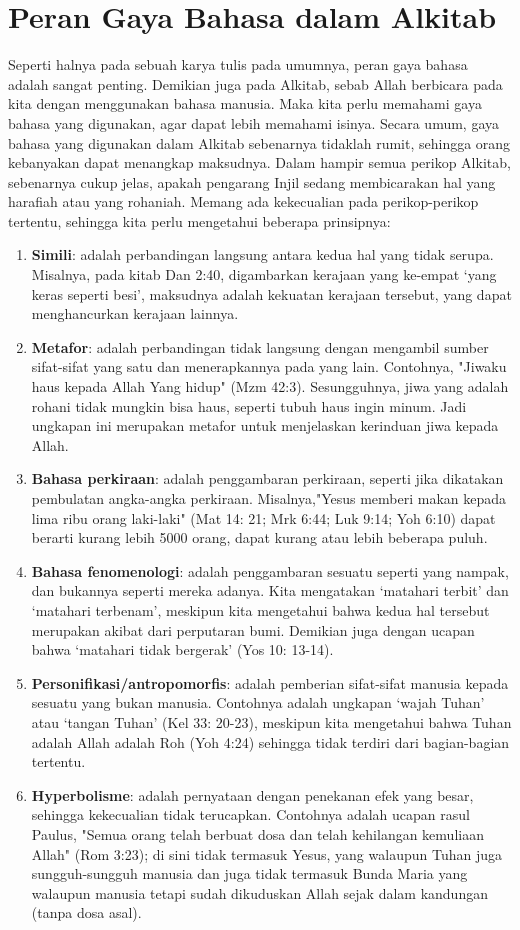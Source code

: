 \section*{Peran Gaya Bahasa dalam Alkitab}
Seperti halnya pada sebuah karya tulis pada umumnya, peran gaya bahasa adalah sangat penting. Demikian juga pada Alkitab, sebab Allah berbicara pada kita dengan menggunakan bahasa manusia. Maka kita perlu memahami gaya bahasa yang digunakan, agar dapat lebih memahami isinya. Secara umum, gaya bahasa yang digunakan dalam Alkitab sebenarnya tidaklah rumit, sehingga orang kebanyakan dapat menangkap maksudnya. Dalam hampir semua perikop Alkitab, sebenarnya cukup jelas, apakah pengarang Injil sedang membicarakan hal yang harafiah atau yang rohaniah. Memang ada kekecualian pada perikop-perikop tertentu, sehingga kita perlu mengetahui beberapa prinsipnya:
\begin{enumerate}
\item \textbf{Simili}: adalah perbandingan langsung antara kedua hal yang tidak serupa. Misalnya, pada kitab Dan 2:40, digambarkan kerajaan yang ke-empat ‘yang keras seperti besi’, maksudnya adalah kekuatan kerajaan tersebut, yang dapat menghancurkan kerajaan lainnya.
\item \textbf{Metafor}: adalah perbandingan tidak langsung dengan mengambil sumber sifat-sifat yang satu dan menerapkannya pada yang lain. Contohnya, "Jiwaku haus kepada Allah Yang hidup" (Mzm 42:3). Sesungguhnya, jiwa yang adalah rohani tidak mungkin bisa haus, seperti tubuh haus ingin minum. Jadi ungkapan ini merupakan metafor untuk menjelaskan kerinduan jiwa kepada Allah.
\item \textbf{Bahasa perkiraan}: adalah penggambaran perkiraan, seperti jika dikatakan pembulatan angka-angka perkiraan. Misalnya,"Yesus memberi makan kepada lima ribu orang laki-laki" (Mat 14: 21; Mrk 6:44; Luk 9:14; Yoh 6:10) dapat berarti kurang lebih 5000 orang, dapat kurang atau lebih beberapa puluh.
\item \textbf{Bahasa fenomenologi}: adalah penggambaran sesuatu seperti yang nampak, dan bukannya seperti mereka adanya. Kita mengatakan ‘matahari terbit’ dan ‘matahari terbenam’, meskipun kita mengetahui bahwa kedua hal tersebut merupakan akibat dari perputaran bumi. Demikian juga dengan ucapan bahwa ‘matahari tidak bergerak’ (Yos 10: 13-14).
\item \textbf{Personifikasi/antropomorfis}: adalah pemberian sifat-sifat manusia kepada sesuatu yang bukan manusia. Contohnya adalah ungkapan ‘wajah Tuhan’ atau ‘tangan Tuhan’ (Kel 33: 20-23), meskipun kita mengetahui bahwa Tuhan adalah Allah adalah Roh (Yoh 4:24) sehingga tidak terdiri dari bagian-bagian tertentu.
\item \textbf{Hyperbolisme}: adalah pernyataan dengan penekanan efek yang besar, sehingga kekecualian tidak terucapkan. Contohnya adalah ucapan rasul Paulus, "Semua orang telah berbuat dosa dan telah kehilangan kemuliaan Allah" (Rom 3:23); di sini tidak termasuk Yesus, yang walaupun Tuhan juga sungguh-sungguh manusia dan juga tidak termasuk Bunda Maria yang walaupun manusia tetapi sudah dikuduskan Allah sejak dalam kandungan (tanpa dosa asal).
\end{enumerate}


